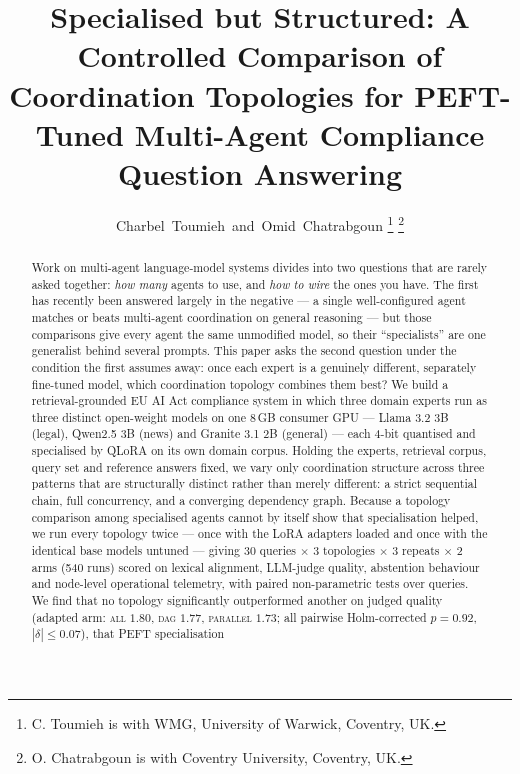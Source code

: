 \documentclass[journal,10pt,compsoc,onecolumn]{IEEEtran}
\begin{document}
\title{Specialised but Structured: A Controlled Comparison of Coordination
Topologies for PEFT-Tuned Multi-Agent Compliance Question Answering}

\author{Charbel~Toumieh~and~Omid~Chatrabgoun%
\thanks{C. Toumieh is with WMG, University of Warwick, Coventry, UK.}%
\thanks{O. Chatrabgoun is with Coventry University, Coventry, UK.}}

\maketitle

\begin{abstract}
Work on multi-agent language-model systems divides into two questions that are
rarely asked together: \emph{how many} agents to use, and \emph{how to wire}
the ones you have. The first has recently been answered largely in the negative
--- a single well-configured agent matches or beats multi-agent coordination on
general reasoning --- but those comparisons give every agent the same
unmodified model, so their ``specialists'' are one generalist behind several
prompts. This paper asks the second question under the condition the first
assumes away: once each expert is a genuinely different, separately fine-tuned
model, which coordination topology combines them best? We build a
retrieval-grounded EU AI Act compliance system in which three domain experts run
as three distinct open-weight models on one 8\,GB consumer GPU --- Llama 3.2 3B
(legal), Qwen2.5 3B (news) and Granite 3.1 2B (general) --- each 4-bit quantised
and specialised by QLoRA on its own domain corpus. Holding the experts,
retrieval corpus, query set and reference answers fixed, we vary only
coordination structure across three patterns that are structurally distinct
rather than merely different: a strict sequential chain, full concurrency, and a
converging dependency graph. Because a topology comparison among specialised
agents cannot by itself show that specialisation helped, we run every topology
twice --- once with the LoRA adapters loaded and once with the identical base
models untuned --- giving 30 queries $\times$ 3 topologies $\times$ 3 repeats
$\times$ 2 arms (540 runs) scored on lexical alignment, LLM-judge quality,
abstention behaviour and node-level operational telemetry, with paired
non-parametric tests over queries. We find that no topology significantly
outperformed another on judged quality (adapted arm: \textsc{all} $1.80$,
\textsc{dag} $1.77$, \textsc{parallel} $1.73$; all pairwise Holm-corrected
$p = 0.92$, $|\delta| \leq 0.07$), that PEFT specialisation

\end{abstract}
\end{document}
